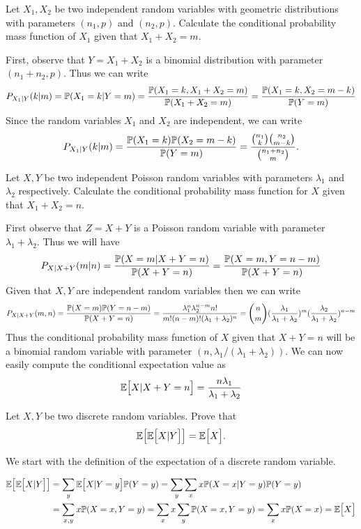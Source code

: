 \begin{problem}
	Let $ X_1,X_2 $ be two independent random variables with geometric distributions with parameters $ (n_1,p) $ and $ (n_2,p) $. Calculate the conditional probability mass function of $ X_1 $ given that $ X_1+X_2 = m $.
\end{problem}
\begin{solution}
	First, observe that $ Y = X_1 + X_2 $ is a binomial distribution with parameter $ (n_1+n_2, p) $. Thus we can write
	\[ P_{X_1|Y}(k|m) = \mathbb{P}(X_1 = k | Y = m) = \frac{\mathbb{P}(X_1 = k, X_1+X_2 = m)}{\mathbb{P}(X_1+X_2 = m)} = \frac{\mathbb{P}(X_1=k, X_2 = m-k)}{\mathbb{P}(Y = m)} \]
	Since the random variables $ X_1 $ and $ X_2 $ are independent, we can write
	\[ P_{X_1|Y}(k|m) = \frac{\mathbb{P}(X_1=k)\mathbb{P}(X_2 = m-k)}{\mathbb{P}(Y=m)} = \frac{\binom{n_1}{k}\binom{n_2}{m-k}}{\binom{n_1+n_2}{m}}. \]
\end{solution}

\begin{problem}
	Let $ X,Y $ be two independent Poisson random variables with parameters $ \lambda_1 $ and $ \lambda_2 $ respectively. Calculate the conditional probability mass function for $ X $ given that $ X_1 + X_2 = n $.
\end{problem}
\begin{solution}
	First observe that $ Z = X + Y $ is a Poisson random variable with parameter $ \lambda_1 + \lambda_2 $. Thus we will have
	\[ P_{X|X+Y}(m|n) = \frac{\mathbb{P}(X=m|X+Y=n)}{\mathbb{P}(X+Y = n)} = \frac{\mathbb{P}(X=m,Y=n-m)}{\mathbb{P}(X+Y = n)} \]
	Given that $ X,Y $ are independent random variables then we can write
	\[ P_{X|X+Y}(m,n) = \frac{\mathbb{P}(X=m)\mathbb{P}(Y=n-m)}{\mathbb{P}(X+Y=n)} = \frac{\lambda_1^n \lambda_2^{n-m}n!}{m!(n-m)!(\lambda_1+\lambda_2)^n} = \binom{n}{m} (\frac{\lambda_1}{\lambda_1+\lambda_2})^m ( \frac{\lambda_2}{\lambda_1+\lambda_2})^{n-m} \]
	Thus the conditional probability mass function of $ X $ given that $ X+Y = n $ will be a binomial random variable with parameter $ (n,\lambda_1/(\lambda_1+\lambda_2)) $. We can now easily compute the conditional expectation value as
	\[ \mathbb{E}\big[X|X+Y = n\big] = \frac{n\lambda_1}{\lambda_1 + \lambda_2} \]
\end{solution}

\begin{problem}
	Let $ X,Y $ be two discrete random variables. Prove that 
	\[ \mathbb{E}\big[\mathbb{E}\big[X|Y\big]\big] = \mathbb{E}\big[X\big]. \]
\end{problem}
\begin{solution}
	We start with the definition of the expectation of a discrete random variable.
	
	\begin{align*}
		\mathbb{E}\big[\mathbb{E}\big[X|Y\big]\big] &= \sum_y \mathbb{E}\big[X|Y=y\big] \mathbb{P}(Y=y) = \sum_y \sum_x x\mathbb{P}(X=x|Y=y)\mathbb{P}(Y=y) \\
		& = \sum_{x,y} x\mathbb{P}(X=x,Y=y) = \sum_x x \sum_y \mathbb{P}(X=x,Y=y) = \sum_x x\mathbb{P}(X=x) = \mathbb{E}\big[X\big]
	\end{align*}
\end{solution}


